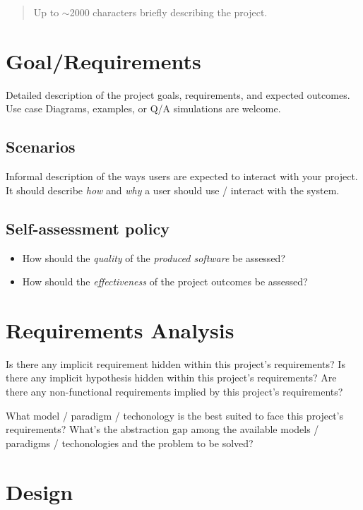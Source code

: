 \begin{abstract}
    Up to $\sim$2000 characters briefly describing the project.
\end{abstract}

\section{Goal/Requirements}

Detailed description of the project goals, requirements, and expected outcomes.
%
Use case Diagrams, examples, or Q/A simulations are welcome.

\subsection{Scenarios}
Informal description of the ways users are expected to interact with your project.
%
It should describe \emph{how} and \emph{why} a user should use / interact with the system.

\subsection{Self-assessment policy}

\begin{itemize}
    \item How should the \emph{quality} of the \emph{produced software} be assessed?

    \item How should the \emph{effectiveness} of the project outcomes be assessed?
\end{itemize}

\section{Requirements Analysis}

Is there any implicit requirement hidden within this project's requirements?
%
Is there any implicit hypothesis hidden within this project's requirements?
%
Are there any non-functional requirements implied by this project's requirements?

What model / paradigm / techonology is the best suited to face this project's requirements?
%
What's the abstraction gap among the available models / paradigms / techonologies and the problem to be solved?

\section{Design}

